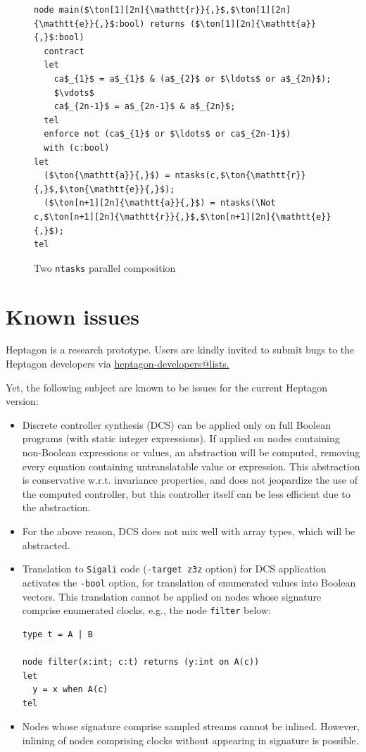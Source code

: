 \documentclass[a4paper]{article}
\begin{document}
\begin{figure}[htb]
  \centering
\begin{lstlisting}
node main($\ton[1][2n]{\mathtt{r}}{,}$,$\ton[1][2n]{\mathtt{e}}{,}$:bool) returns ($\ton[1][2n]{\mathtt{a}}{,}$:bool)
  contract
  let
    ca$_{1}$ = a$_{1}$ & (a$_{2}$ or $\ldots$ or a$_{2n}$);
    $\vdots$
    ca$_{2n-1}$ = a$_{2n-1}$ & a$_{2n}$;
  tel
  enforce not (ca$_{1}$ or $\ldots$ or ca$_{2n-1}$)
  with (c:bool)
let
  ($\ton{\mathtt{a}}{,}$) = ntasks(c,$\ton{\mathtt{r}}{,}$,$\ton{\mathtt{e}}{,}$); 
  ($\ton[n+1][2n]{\mathtt{a}}{,}$) = ntasks(\Not c,$\ton[n+1][2n]{\mathtt{r}}{,}$,$\ton[n+1][2n]{\mathtt{e}}{,}$); 
tel
\end{lstlisting}
  \caption{Two \texttt{ntasks} parallel composition}
  \label{fig:ntasks-compos}
\end{figure}

\section{Known issues}
\label{sec:known-issues}

Heptagon is a research prototype. Users are kindly invited to submit bugs to the
Heptagon developers via \url{heptagon-developers@lists.}

Yet, the following subject are known to be issues for the current Heptagon
version:
\begin{itemize}
\item Discrete controller synthesis (DCS) can be applied only on full Boolean
  programs (with static integer expressions). If applied on nodes containing
  non-Boolean expressions or values, an abstraction will be computed, removing
  every equation containing untranslatable value or expression. This abstraction
  is conservative w.r.t. invariance properties, and does not jeopardize the use
  of the computed controller, but this controller itself can be less efficient
  due to the abstraction.
\item For the above reason, DCS does not mix well with array types, which will
  be abstracted.
\item Translation to \texttt{Sigali} code (\texttt{-target z3z} option) for DCS
  application activates the \texttt{-bool} option, for translation of enumerated
  values into Boolean vectors. This translation cannot be applied on nodes whose
  signature comprise enumerated clocks, e.g., the node \lstinline{filter} below:

\begin{lstlisting}
type t = A | B

node filter(x:int; c:t) returns (y:int on A(c))
let
  y = x when A(c)
tel
\end{lstlisting}

\item Nodes whose signature comprise sampled streams cannot be inlined. However,
  inlining of nodes comprising clocks without appearing in signature is
  possible.
\end{itemize}
\end{document}
